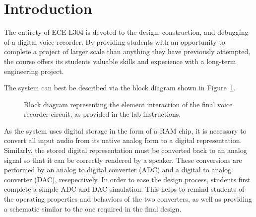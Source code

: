 \section{Introduction}
The entirety of ECE-L304 is devoted to the design, construction, and debugging
of a digital voice recorder.  By providing students with an opportunity to
complete a project of larger scale than anything they have previously
attempted, the course offers its students valuable skills and experience with a
long-term engineering project.

The system can best be described via the block diagram shown in
Figure~\ref{f:block}.
%
\begin{figure}[H]
\centering
	
	\parbox{.6\textwidth}{
	\caption[Voice Recorder Block Diagram]{Block diagram representing the
	element interaction of the final voice recorder circuit, as provided in the
	lab instructions.}
	\label{f:block}}
\end{figure}
%
As the system uses digital storage in the form of a RAM chip, it is necessary
to convert all input audio from its native analog form to a digital
representation.  Similarly, the stored digital representation must be converted
back to an analog signal so that it can be correctly rendered by a speaker.
These conversions are performed by an analog to digital converter (ADC) and a
digital to analog converter (DAC), resepectively.
%
In order to ease the design process, students first complete a simple ADC and
DAC simulation.  This helps to remind students of the operating properties and
behaviors of the two converters, as well as providing a schematic similar to
the one required in the final design.
